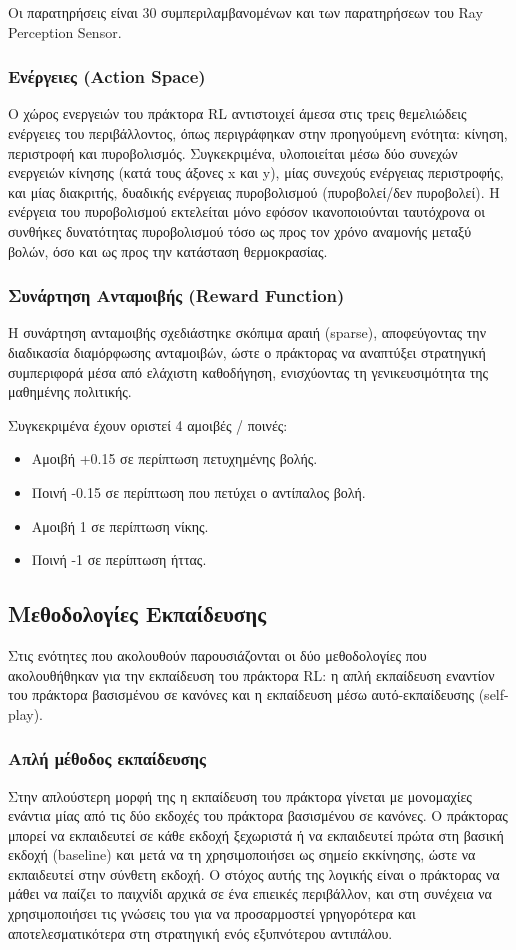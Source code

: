 \documentclass[12pt]{article}
\begin{document}
Οι παρατηρήσεις είναι 30 συμπεριλαμβανομένων και των παρατηρήσεων του Ray Perception Sensor.

\subsubsection{Ενέργειες (Action Space)}
Ο χώρος ενεργειών του πράκτορα RL αντιστοιχεί άμεσα στις τρεις θεμελιώδεις ενέργειες του περιβάλλοντος, όπως περιγράφηκαν στην προηγούμενη ενότητα: κίνηση, περιστροφή και πυροβολισμός. Συγκεκριμένα, υλοποιείται μέσω δύο συνεχών ενεργειών κίνησης (κατά τους άξονες x και y), μίας συνεχούς ενέργειας περιστροφής, και μίας διακριτής, δυαδικής ενέργειας πυροβολισμού (πυροβολεί/δεν πυροβολεί). Η ενέργεια του πυροβολισμού εκτελείται μόνο εφόσον ικανοποιούνται ταυτόχρονα οι συνθήκες δυνατότητας πυροβολισμού τόσο ως προς τον χρόνο αναμονής μεταξύ βολών, όσο και ως προς την κατάσταση θερμοκρασίας.

\subsubsection{Συνάρτηση Ανταμοιβής (Reward Function)}
Η συνάρτηση ανταμοιβής σχεδιάστηκε σκόπιμα αραιή (sparse), αποφεύγοντας την διαδικασία διαμόρφωσης ανταμοιβών, ώστε ο πράκτορας να αναπτύξει στρατηγική συμπεριφορά μέσα από ελάχιστη καθοδήγηση, ενισχύοντας τη γενικευσιμότητα της μαθημένης πολιτικής.

Συγκεκριμένα έχουν οριστεί 4 αμοιβές / ποινές:

\begin{itemize}
\item Αμοιβή +0.15 σε περίπτωση πετυχημένης βολής.
\item Ποινή -0.15 σε περίπτωση που πετύχει ο αντίπαλος βολή.
\item Αμοιβή 1 σε περίπτωση νίκης.
\item Ποινή -1 σε περίπτωση ήττας.
\end{itemize}

\subsection{Μεθοδολογίες Εκπαίδευσης}
Στις ενότητες που ακολουθούν παρουσιάζονται οι δύο μεθοδολογίες που ακολουθήθηκαν για την εκπαίδευση του πράκτορα RL: η απλή εκπαίδευση εναντίον του πράκτορα βασισμένου σε κανόνες και η εκπαίδευση μέσω αυτό-εκπαίδευσης (self-play).

\subsubsection{Απλή μέθοδος εκπαίδευσης}
Στην απλούστερη μορφή της η εκπαίδευση του πράκτορα γίνεται με μονομαχίες ενάντια μίας από τις δύο εκδοχές του πράκτορα βασισμένου σε κανόνες. Ο πράκτορας μπορεί να εκπαιδευτεί σε κάθε εκδοχή ξεχωριστά ή να εκπαιδευτεί πρώτα στη βασική εκδοχή (baseline) και μετά να τη χρησιμοποιήσει ως σημείο εκκίνησης, ώστε να εκπαιδευτεί στην σύνθετη εκδοχή. Ο στόχος αυτής της λογικής είναι ο πράκτορας να μάθει να παίζει το παιχνίδι αρχικά σε ένα επιεικές περιβάλλον, και στη συνέχεια να χρησιμοποιήσει τις γνώσεις του για να προσαρμοστεί γρηγορότερα και αποτελεσματικότερα στη στρατηγική ενός εξυπνότερου αντιπάλου.
\end{document}
